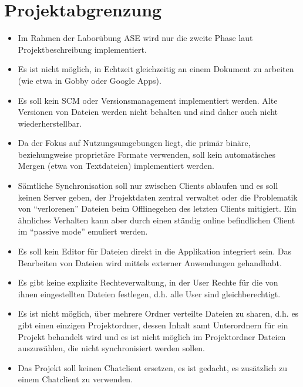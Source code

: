 
\section{Projektabgrenzung}
\begin{itemize}
  \item Im Rahmen der Laborübung ASE wird nur die zweite Phase laut Projektbeschreibung implementiert.
  \item Es ist nicht möglich, in Echtzeit gleichzeitig an einem Dokument zu arbeiten (wie etwa in Gobby oder Google Apps).
  \item Es soll kein SCM oder Versionsmanagement implementiert werden. Alte Versionen von Dateien werden nicht behalten und sind daher auch nicht wiederherstellbar.
  \item Da der Fokus auf Nutzungsumgebungen liegt, die primär binäre, beziehungweise proprietäre Formate verwenden, soll kein automatisches Mergen (etwa von Textdateien) implementiert werden.
  \item Sämtliche Synchronisation soll nur zwischen Clients ablaufen und es soll keinen Server geben, der Projektdaten zentral verwaltet oder die Problematik von ``verlorenen'' Dateien beim Offlinegehen des letzten Clients mitigiert. Ein ähnliches Verhalten kann aber durch einen ständig online befindlichen Client im ``passive mode'' emuliert werden.
  \item Es soll kein Editor für Dateien direkt in die Applikation integriert sein. Das Bearbeiten von Dateien wird mittels externer Anwendungen gehandhabt.
  \item Es gibt keine explizite Rechteverwaltung, in der User Rechte für die von ihnen eingestellten Dateien festlegen, d.h. alle User sind gleichberechtigt.
  \item Es ist nicht möglich, über mehrere Ordner verteilte Dateien zu sharen, d.h. es gibt einen einzigen Projektordner, dessen Inhalt samt Unterordnern für ein Projekt behandelt wird und es ist nicht möglich im Projektordner Dateien auszuwählen, die nicht synchronisiert werden sollen.
  \item Das Projekt soll keinen Chatclient ersetzen, es ist gedacht, es zusätzlich zu einem Chatclient zu verwenden.
\end{itemize}
